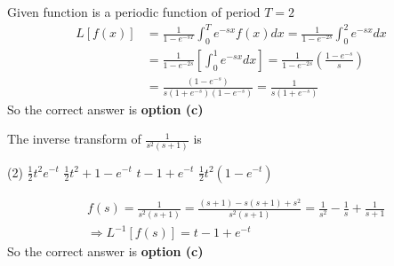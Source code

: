 \begin{answer}
	Given function is a periodic function of period $T=2$
	\begin{align*}
	L[f(x)] &=\frac{1}{1-e^{-s T}} \int_{0}^{T} e^{-s x} f(x) d x=\frac{1}{1-e^{-2 s}} \int_{0}^{2} e^{-s x} d x \\
	&=\frac{1}{1-e^{-2 s}}\left[\int_{0}^{1} e^{-s x} d x\right]=\frac{1}{1-e^{-2 s}}\left(\frac{1-e^{-s}}{s}\right) \\
	&=\frac{\left(1-e^{-s}\right)}{s\left(1+e^{-s}\right)\left(1-e^{-s}\right)}=\frac{1}{s\left(1+e^{-s}\right)}
	\end{align*}
	So the correct answer is \textbf{option (c)}
\end{answer}
\begin{exercise}
	The inverse transform of $\frac{1}{s^2(s+1)}$ is
	 \begin{tasks}(2)
		\task[\textbf{a.}]$\frac{1}{2} t^{2} e^{-t}$
		\task[\textbf{b.}]$\frac{1}{2} t^{2}+1-e^{-t}$
		\task[\textbf{c.}]$t-1+e^{-t}$
		\task[\textbf{d.}] $\frac{1}{2} t^{2}\left(1-e^{-t}\right)$ 
	\end{tasks}
\end{exercise}
\begin{answer}
	\begin{align*}
	&f(s)=\frac{1}{s^{2}(s+1)}=\frac{(s+1)-s(s+1)+s^{2}}{s^{2}(s+1)}=\frac{1}{s^{2}}-\frac{1}{s}+\frac{1}{s+1} \\
	&\Rightarrow L^{-1}[f(s)]=t-1+e^{-t}
	\end{align*}
		So the correct answer is \textbf{option (c)}
\end{answer}
